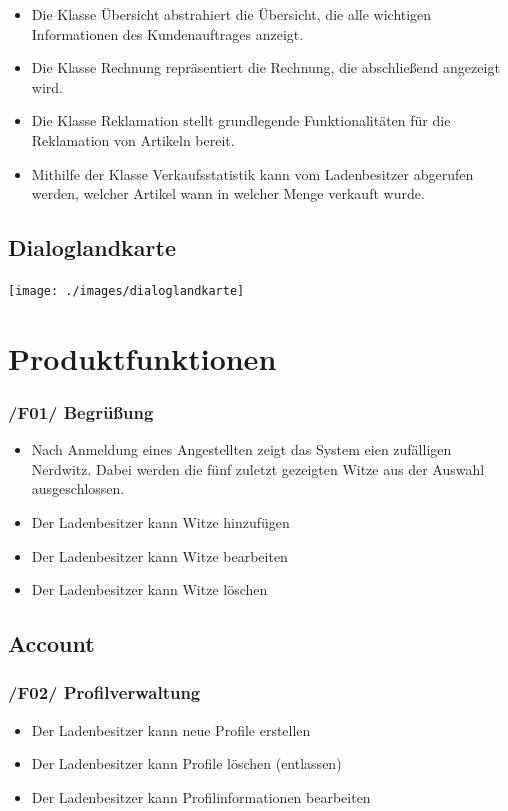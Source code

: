 \documentclass[pdftex,12pt,a4paper]{article}
\begin{document}
\begin{itemize}
\item Die Klasse Übersicht abstrahiert die Übersicht, die alle wichtigen Informationen des Kundenauftrages anzeigt.
\item Die Klasse Rechnung repräsentiert die Rechnung, die abschließend angezeigt wird.
\item Die Klasse Reklamation stellt grundlegende Funktionalitäten für die Reklamation von Artikeln bereit.
\item Mithilfe der Klasse Verkaufsstatistik kann vom Ladenbesitzer abgerufen werden, welcher Artikel wann in welcher Menge verkauft wurde.
\end{itemize}
\subsection*{Dialoglandkarte}
\texttt{[image: ./images/dialoglandkarte]}
\newpage

\section{Produktfunktionen}
\subsubsection*{/F01/ Begr\"u\ss{}ung}
\begin{itemize}
\item Nach Anmeldung eines Angestellten zeigt das System eien zuf\"alligen Nerdwitz. Dabei werden die f\"unf zuletzt gezeigten Witze aus der Auswahl ausgeschlossen.
\item Der Ladenbesitzer kann Witze hinzuf\"ugen
\item Der Ladenbesitzer kann Witze bearbeiten
\item Der Ladenbesitzer kann Witze l\"oschen
\end{itemize}
\subsection*{Account}
\subsubsection*{/F02/ Profilverwaltung}
\begin{itemize}
\item Der Ladenbesitzer kann neue Profile erstellen
\item Der Ladenbesitzer kann Profile l\"oschen (entlassen)
\item Der Ladenbesitzer kann Profilinformationen bearbeiten
\end{itemize}
\end{document}
